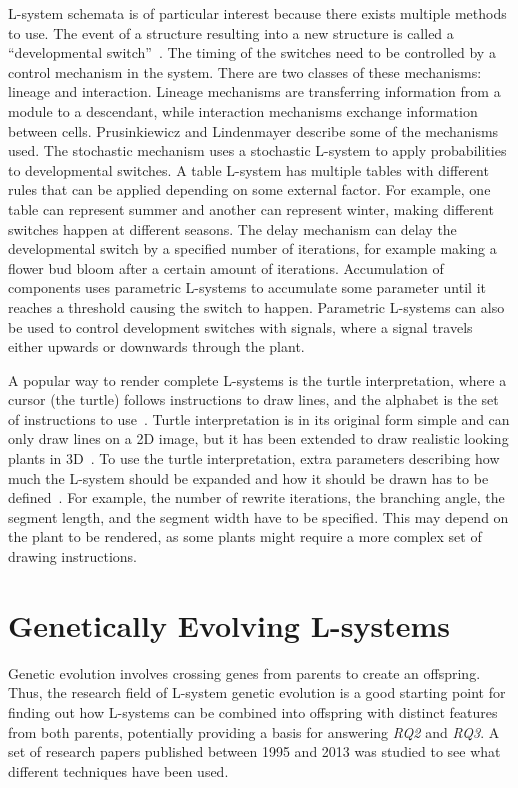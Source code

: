 L-system schemata is of particular interest because there exists multiple methods to use.
The event of a structure resulting into a new structure is called a ``developmental switch''~\cite{2012Prusinkiewicz}.
The timing of the switches need to be controlled by a control mechanism in the system.
There are two classes of these mechanisms: lineage and interaction.
Lineage mechanisms are transferring information from a module to a descendant, while interaction mechanisms exchange information between cells.
Prusinkiewicz and Lindenmayer describe some of the mechanisms used.
The stochastic mechanism uses a stochastic L-system to apply probabilities to developmental switches.
A table L-system has multiple tables with different rules that can be applied depending on some external factor.
For example, one table can represent summer and another can represent winter, making different switches happen at different seasons.
The delay mechanism can delay the developmental switch by a specified number of iterations, for example making a flower bud bloom after a certain amount of iterations.
Accumulation of components uses parametric L-systems to accumulate some parameter until it reaches a threshold causing the switch to happen.
Parametric L-systems can also be used to control development switches with signals, where a signal travels either upwards or downwards through the plant.~\cite{2012Prusinkiewicz}

A popular way to render complete L-systems is the turtle interpretation, where a cursor (the turtle) follows instructions to draw lines, and the alphabet is the set of instructions to use~\cite{2012Prusinkiewicz}.
Turtle interpretation is in its original form simple and can only draw lines on a 2D image, but it has been extended to draw realistic looking plants in 3D~\cite{1998Prusinkiewicz}.
To use the turtle interpretation, extra parameters describing how much the L-system should be expanded and how it should be drawn has to be defined~\cite{2012Prusinkiewicz}.
For example, the number of rewrite iterations, the branching angle, the segment length, and the segment width have to be specified.
This may depend on the plant to be rendered, as some plants might require a more complex set of drawing instructions.

\section{Genetically Evolving L-systems}
Genetic evolution involves crossing genes from parents to create an offspring.
Thus, the research field of L-system genetic evolution is a good starting point for finding out how L-systems can be combined into offspring with distinct features from both parents, potentially providing a basis for answering \textit{RQ2} and \textit{RQ3}.
A set of research papers published between 1995 and 2013 was studied to see what different techniques have been used.

